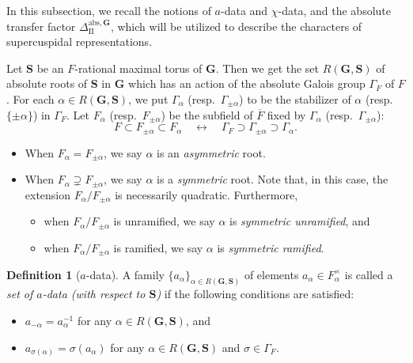 \documentclass{amsart}
\newcommand{\abs}{\mathrm{abs}}
\newcommand{\ol}{\overline}
\newcommand{\bfG}{\mathbf{G}}
\newcommand{\bfS}{\mathbf{S}}
\newcommand{\II}{\mathrm{II}}
\theoremstyle{plain}
\theoremstyle{definition}
\newtheorem{defn}[thm]{Definition}
\theoremstyle{remark}
\theoremstyle{theorem}
\begin{document}
In this subsection, we recall the notions of $a$-data and $\chi$-data, and the absolute transfer factor $\Delta_{\II}^{\abs,\bfG}$, which will be utilized to describe the characters of supercuspidal representations.

Let $\bfS$ be an $F$-rational maximal torus of $\bfG$.
Then we get the set $R(\bfG,\bfS)$ of absolute roots of $\bfS$ in $\bfG$ which has an action of the absolute Galois group $\Gamma_{F}$ of $F$.
For each $\alpha\in R(\bfG,\bfS)$, we put $\Gamma_{\alpha}$ (resp.\ $\Gamma_{\pm\alpha}$) to be the stabilizer of $\alpha$ (resp.\ $\{\pm\alpha\}$) in $\Gamma_{F}$.
Let $F_{\alpha}$ (resp.\ $F_{\pm\alpha}$) be the subfield of $\ol{F}$ fixed by $\Gamma_{\alpha}$ (resp.\ $\Gamma_{\pm\alpha}$): 
\[
F\subset F_{\pm\alpha}\subset F_{\alpha}
\quad
\longleftrightarrow
\quad
\Gamma_{F}\supset \Gamma_{\pm\alpha}\supset \Gamma_{\alpha}.
\]
\begin{itemize}
\item
When $F_{\alpha}=F_{\pm\alpha}$, we say $\alpha$ is an \textit{asymmetric} root.
\item
When $F_{\alpha}\supsetneq F_{\pm\alpha}$, we say $\alpha$ is a \textit{symmetric} root.
Note that, in this case, the extension $F_{\alpha}/F_{\pm\alpha}$ is necessarily quadratic.
Furthermore,
\begin{itemize}
\item
when $F_{\alpha}/F_{\pm\alpha}$ is unramified, we say $\alpha$ is \textit{symmetric unramified}, and
\item
when $F_{\alpha}/F_{\pm\alpha}$ is ramified, we say $\alpha$ is \textit{symmetric ramified}.
\end{itemize}
\end{itemize}

\begin{defn}[$a$-data]
A family $\{a_{\alpha}\}_{\alpha\in R(\bfG,\bfS)}$ of elements $a_{\alpha}\in F_{\alpha}^{\times}$ is called a \textit{set of $a$-data (with respect to $\bfS$)} if the following conditions are satisfied:
\begin{itemize}
\item
$a_{-\alpha}=a_{\alpha}^{-1}$ for any $\alpha\in R(\bfG,\bfS)$, and
\item
$a_{\sigma(\alpha)}=\sigma(a_{\alpha})$ for any $\alpha\in R(\bfG,\bfS)$ and $\sigma\in\Gamma_{F}$.
\end{itemize}
\end{defn}
\end{document}
